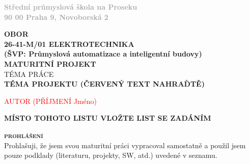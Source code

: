 \documentclass[12pt,a4paper]{article} %
\begin{document}
\begin{titlepage}
\begin{minipage}{0.3\textwidth}
\end{minipage}
\begin{adjustbox}{minipage=0.55\textwidth,left}
	\textbf{\textcolor{darkgray}{
	Střední průmyslová škola na Proseku\\
	90 00 Praha 9, Novoborská 2}}
\end{adjustbox}

\center

\textbf{\large OBOR}\\[0.5cm]
\textbf{\large	26-41-M/01 ELEKTROTECHNIKA\\
				(ŠVP: Průmyslová automatizace a inteligentní budovy)}\\[4.5cm]
\textbf{\LARGE MATURITNÍ PROJEKT}\\[1.5cm]
\textsc{TÉMA PRÁCE}\\[1.5cm]
\textbf{\color{red} \huge \bfseries  TÉMA PROJEKTU (ČERVENÝ TEXT NAHRAĎTĚ)}

\vspace*{\fill}

\begin{minipage}{0.49\textwidth}
\begin{flushleft} \large
\the\year %
\end{flushleft}
\end{minipage}
\begin{minipage}{0.49\textwidth}
\begin{flushright}
\textcolor{red}{\large AUTOR (PŘÍJMENÍ Jméno)}
\end{flushright}
\end{minipage}


\end{titlepage}




\textbf{\color{red} \LARGE MÍSTO TOHOTO LISTU VLOŽTE LIST SE ZADÁNÍM}
\newpage

\textsc{\textbf{\fontsize{20pt}{0}\selectfont prohlášení}}\\

{Prohlašuji, že jsem svou maturitní práci vypracoval samostatně a použil jsem pouze podklady (literaturu, projekty, SW, atd.) uvedené v seznamu.
}\\
\end{document}
